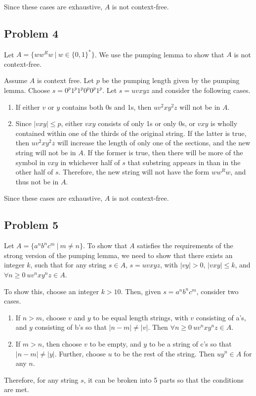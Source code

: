 \documentclass[12pt]
{article}
\begin{document}
Since these cases are exhaustive, $A$ is not context-free. 

\subsection*{Problem 4}

Let $A = \{ww^Rw~|~ w \in \{0,1\}^* \}$.  We use the pumping
lemma to show that $A$ is not context-free.

Assume $A$ is context free.  Let $p$ be the pumping length given by
the pumping lemma.  Choose $s = 0^p1^p1^p0^p 0^p1^p$.  Let $s = uvxyz$ and
consider the following cases.  

\begin{enumerate}
\item If either  $v$ or $y$ contains both 0s and 1s, then $uv^2xy^2z$
  will not be in $A$.  

\item Since $|vxy| \leq p$, either $vxy$ consists of only 1s or only
  0s, or $vxy$ is wholly contained within one of the thirds of the
  original string.  If the latter is true, then $uv^2xy^2z$ will
  increase the length of only one of the sections, and the new string
  will not be in $A$.  If the former is true, then there will be more
  of the symbol in $vxy$ in whichever half of $s$ that substring appears in
  than in the other half of $s$.  Therefore, the new string will not
  have the form $ww^Rw$, and thus not be in $A$.  

\end{enumerate}

Since these cases are exhaustive, $A$ is not context-free. 

\subsection*{Problem 5}

Let $A = \{a^nb^nc^m~|~ m \neq n \}$.  To show that $A$ satisfies the
requirements of the strong version of the pumping lemma, we need to
show that there exists an integer $k$, such that for any string $s \in
A$, $s = uvxyz$, with $|vy| > 0$, $|vxy| \leq k$, and $\forall n
\geq 0~uv^nxy^nz \in A$.  

To show this, choose an integer $k > 10$.  Then, given $s = a^nb^nc^m$,
consider two cases.
\begin{enumerate}
\item If $n > m$, choose $v$ and $y$ to be equal length strings, with
  $v$ consisting of a's, and $y$ consisting of b's so that $|n - m|
  \neq |v|$.  Then $\forall n \geq0 ~uv^nxy^nz \in A$.

\item If $m > n$, then choose $v$ to be empty, and $y$ to be a string
  of c's so that $|n - m| \neq |y|$.  Further, choose $u$ to be the
  rest of the string.  Then $uy^n \in A$ for any $n$.

\end{enumerate}

Therefore, for any string $s$, it can be broken into 5 parts so that
the conditions are met.  
\end{document}
